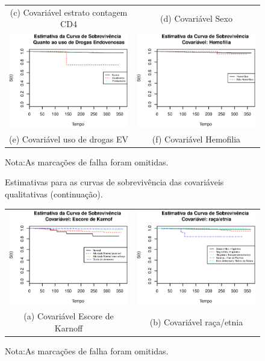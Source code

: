 \documentclass[
	12pt,				%
	openright,			%
	twoside,			%
	a4paper,			%
	english,			%
	brazil				%
	]{abntex2}
\begin{document}
\begin{figure}[!ht]
\begin{tabular}{cc}
(c) Covariável estrato contagem CD4 & (d) Covariável Sexo \\[6pt]
 \includegraphics[width=65mm]{Rplot07} &   \includegraphics[width=65mm]{Rplot08} \\
(e) Covariável uso de drogas EV & (f) Covariável Hemofilia \\[6pt]
  \end{tabular}
      \caption*{\tiny{Nota:As marcações de falha foram omitidas.}}
\end{figure}

\begin{figure}[!ht]
  \caption{Estimativas para as curvas de sobrevivência das covariáveis qualitativas (continuação).}
  \begin{tabular}{cc}
    \label{fig:expdif2}
  \includegraphics[width=65mm]{Rplot09} &   \includegraphics[width=65mm]{Rplot10} \\
(a) Covariável Escore de Karnoff & (b) Covariável raça/etnia \\[6pt]
  \end{tabular}
        \caption*{\tiny{Nota:As marcações de falha foram omitidas.}}

\end{figure}
\end{document}
